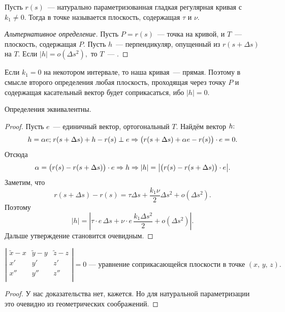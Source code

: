 \documentclass{notes}
\begin{document}
	\begin{de}
		Пусть $r(s)$~--- натурально параметризованная гладкая регулярная кривая с $k_1 \neq 0$. Тогда  в точке называется плоскость, содержащая $\tau$ и $\nu$.
		\begin{proof}[Альтернативное определение]
			Пусть $P = r(s)$~--- точка на кривой, и $T$~--- плоскость, содержащая $P$. Пусть $h$~--- перпендикуляр, опущенный из $r(s + \Delta s)$ на $T$. Если $|h| = o(\Delta s^2),$ то $T$~--- .
		\end{proof}
	\end{de}

	\begin{rem}
		Если $k_1 = 0$ на некотором интервале, то наша кривая~--- прямая. Поэтому в смысле второго определения любая плоскость, проходящая через точку $P$ и содержащая касательный вектор будет соприкасаться, ибо $|h| = 0$.
	\end{rem}

	\begin{thm}
		Определения эквивалентны.
		\begin{proof}
			Пусть $e$~--- единичный вектор, ортогональный $T$. Найдём вектор $h\text{\text{:}}$
			\[
				h = \alpha e \text{\text{;}} \; r(s + \Delta s) + h - r(s) \perp e \Rightarrow \big(r(s + \Delta s) + \alpha e - r(s)\big) \cdot e = 0.
			\]
			Отсюда
			\[
				\alpha = \big(r(s) - r(s + \Delta s)\big) \cdot e \Rightarrow h \Rightarrow |h| = \big|\big(r(s) - r(s + \Delta s)\big) \cdot e\big|.
			\]
			Заметим, что
			\[
				r(s + \Delta s) - r(s) = \tau \Delta s + \dfrac{k_1 \nu}{2} \Delta s^2 + o(\Delta s^2).
			\]
			Поэтому
			\[
				|h| = \left|\tau \cdot e \, \Delta s + \nu \cdot e \, \dfrac{k_1 \Delta s^2}{2} + o(\Delta s^2)\right|.
			\]
			Дальше утверждение становится очевидным.
		\end{proof}
	\end{thm}

	\begin{thm}
		\[
			\left| 
			\begin{array}{ccc}
				\tilde{x} - x & \tilde{y} - y & \tilde{z} - z \\
				x' & y' & z' \\
				x'' & y'' & z'' \\
			\end{array}
			\right| = 0 \text{~--- уравнение соприкасающейся плоскости в точке } (x, \, y, \, z). 
		\]
		\begin{proof}
			У нас доказательства нет, кажется. Но для натуральной параметризации это очевидно из геометрических соображений.
		\end{proof}
	\end{thm}
\end{document}
